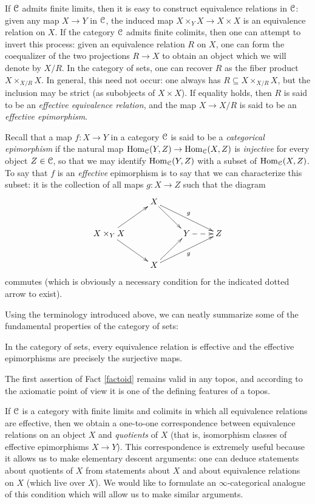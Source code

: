 If $\operatorname{\mathcal{C}}$ admits finite limits, then it is easy to construct
equivalence relations in $\operatorname{\mathcal{C}}$: given any map $X \rightarrow Y$
in $\operatorname{\mathcal{C}}$, the induced map $X \times_Y X \rightarrow X \times X$
is an equivalence relation on $X$. If the category $\operatorname{\mathcal{C}}$ admits
finite colimits, then one can attempt to invert this process:
given an equivalence relation $R$ on $X$, one can form the
coequalizer of the two projections $R \rightarrow X$ to obtain an
object which we will denote by $X/R$. In the category of sets, one
can recover $R$ as the fiber product $X \times_{X/R} X$. In
general, this need not occur: one always has $R \subseteq X
\times_{X/R} X$, but the inclusion may be strict (as subobjects of
$X \times X$). If equality holds, then $R$ is said to be an {\it
effective equivalence relation}, and the map $X \rightarrow X/R$
is said to be an {\it effective epimorphism}.

\begin{remark}
Recall that a map $f: X \rightarrow Y$ in a category $\operatorname{\mathcal{C}}$ is said to be
a {\it categorical epimorphism} if the natural map $\operatorname{Hom}_{\operatorname{\mathcal{C}}}(Y,Z) \rightarrow \operatorname{Hom}_{\operatorname{\mathcal{C}}}(X,Z)$ is {\em injective} for every object $Z \in \operatorname{\mathcal{C}}$, so that we may identify
$\operatorname{Hom}_{\operatorname{\mathcal{C}}}(Y,Z)$ with a subset of $\operatorname{Hom}_{\operatorname{\mathcal{C}}}(X,Z)$. 
To say that $f$ is an {\em effective} epimorphism is to say that we can characterize this subset: it is the collection of all maps $g: X \rightarrow Z$ such that the diagram
$$ \xymatrix{ & X \ar[dr] \ar[drr]^{g} & & \\
X \times_{Y} X \ar[ur] \ar[dr] & & Y \ar@{-->}[r] & Z \\
& X \ar[ur] \ar[urr]_{g} & & }$$
commutes (which is obviously a necessary condition for the indicated dotted arrow to exist).
\end{remark}

Using the terminology introduced above, we can neatly summarize some of the fundamental properties of the category of sets:

\begin{fact}\label{factoid}
In the category of sets, every equivalence relation is
effective and the effective epimorphisms are precisely the
surjective maps.
\end{fact}

The first assertion of Fact \ref{factoid} remains valid in any
topos, and according to the axiomatic point of view it is one of
the defining features of a topos.

If $\operatorname{\mathcal{C}}$ is a category with finite limits and colimits in which
all equivalence relations are effective, then we obtain a
one-to-one correspondence between equivalence relations on an
object $X$ and {\em quotients} of $X$ (that is, isomorphism classes
of effective epimorphisms $X \rightarrow Y$). This correspondence
is extremely useful because it allows us to make elementary
descent arguments: one can deduce statements about quotients of
$X$ from statements about $X$ and about equivalence relations on
$X$ (which live over $X$). We would like to formulate an $\infty$-categorical analogue of this condition which will allow us to make similar arguments.

